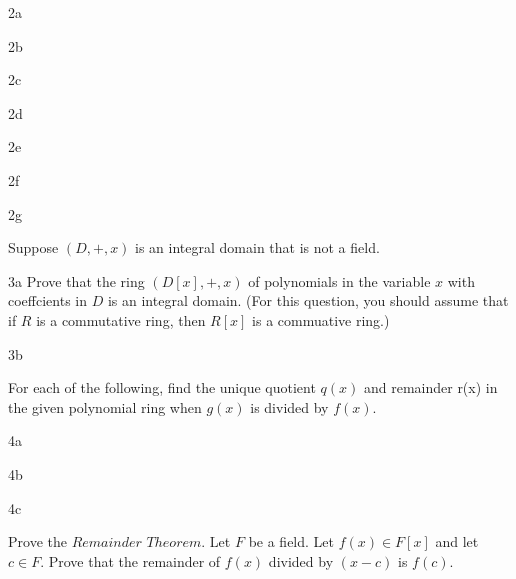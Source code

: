 \begin{question}{2a}
\end{question}
\begin{question}{2b}
\end{question}
\begin{question}{2c}
\end{question}
\begin{question}{2d}
\end{question}
\begin{question}{2e}
\end{question}
\begin{question}{2f}
\end{question}
\begin{question}{2g}
\end{question}
\begin{question}{3}
Suppose $(D, +, x)$ is an integral domain that is not a field.
\end{question}
\begin{question}{3a}
Prove that the ring $(D[x], +, x)$ of polynomials in the variable $x$ with coeffcients in $D$ is an integral domain. (For this question, you should assume that if $R$ is a commutative ring, then $R[x]$ is a commuative ring.)
\end{question}

\begin{question}{3b}
\end{question}
\begin{question}{4}
For each of the following, find the unique quotient $q(x)$ and remainder r(x) in the given polynomial ring when $g(x)$ is divided by $f(x)$.
\end{question}
\begin{question}{4a}
\end{question}
\begin{question}{4b}
\end{question}
\begin{question}{4c}
\end{question}
\begin{question}{5}
Prove the $Remainder$ $Theorem$. Let $F$ be a field. Let $f(x) \in F[x]$ and let $c \in F$. Prove that the remainder of $f(x)$ divided by $(x-c)$ is $f(c)$.
\end{question}

